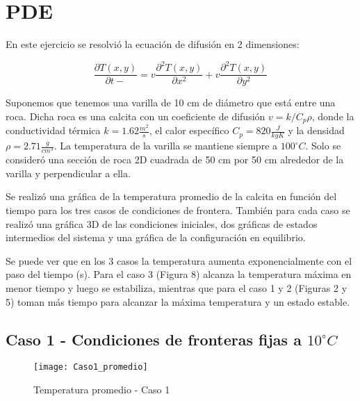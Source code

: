 \documentclass{article}
\begin{document}
\section{PDE}

En este ejercicio se resolvió la ecuación de difusión en 2 dimensiones: 

\begin{equation}
    \frac{\partial T (x,y)}{\partial t-} = v \frac{\partial^2 T(x,y)}{\partial x^2} + v \frac{\partial^2 T (x,y)}{\partial y^2}
\end{equation}

\vspace{3mm}

Suponemos que tenemos una varilla de 10 cm de diámetro que está entre una roca. Dicha roca es una calcita con un coeficiente de difusión $v = k/C_{p}\rho$, donde la conductividad térmica $k = 1.62 \frac{m^2}{s}$, el calor específico $C_{p} = 820 \frac{J}{kg K}$ y la densidad $\rho = 2.71 \frac{g}{cm^3}$. La temperatura de la varilla se mantiene siempre a $100^\circ C$. Solo se consideró una sección de roca 2D cuadrada de 50 cm por 50 cm alrededor de la varilla y perpendicular a ella. 

\vspace{3mm}

Se realizó una gráfica de la temperatura promedio de la calcita en función del tiempo para los tres casos de condiciones de frontera. También para cada caso se realizó una gráfica 3D de las condiciones iniciales, dos gráficas de estados intermedios del sistema y una gráfica de la configuración en equilibrio. 

\vspace{3mm}
Se puede ver que en los 3 casos la temperatura aumenta exponencialmente con el paso del tiempo (s). Para el caso 3 (Figura 8) alcanza la temperatura máxima en menor tiempo y luego se estabiliza, mientras que para el caso 1 y 2 (Figuras 2 y 5) toman más tiempo para alcanzar la máxima temperatura y un estado estable.

\newpage

\subsection{Caso 1 - Condiciones de fronteras fijas a $10^\circ C$}


\begin{figure}[h!]
\centering
\texttt{[image: Caso1\_promedio]}
\caption{Temperatura promedio - Caso 1}
\label{temp1}
\end{figure}
\end{document}
